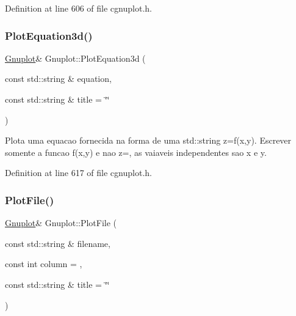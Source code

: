 Definition at line 606 of file cgnuplot.\+h.

\mbox{\label{class_gnuplot_a545ea6339c234d277339ab148cd11dba}} 
\subsubsection{\texorpdfstring{Plot\+Equation3d()}{PlotEquation3d()}}
{\footnotesize\ttfamily \hyperlink{class_gnuplot}{Gnuplot}\& Gnuplot\+::\+Plot\+Equation3d (\begin{DoxyParamCaption}\item[{const std\+::string \&}]{equation,  }\item[{const std\+::string \&}]{title = {\ttfamily \char`\"{}\char`\"{}} }\end{DoxyParamCaption})\hspace{0.3cm}{\ttfamily [inline]}}



Plota uma equacao fornecida na forma de uma std\+::string z=f(x,y). Escrever somente a funcao f(x,y) e nao z=, as vaiaveis independentes sao x e y. 



Definition at line 617 of file cgnuplot.\+h.

\mbox{\label{class_gnuplot_a12ba90a46e80421f655049cb1d1d835d}} 
\subsubsection{\texorpdfstring{Plot\+File()}{PlotFile()}\hspace{0.1cm}{\footnotesize\ttfamily [1/3]}}
{\footnotesize\ttfamily \hyperlink{class_gnuplot}{Gnuplot}\& Gnuplot\+::\+Plot\+File (\begin{DoxyParamCaption}\item[{const std\+::string \&}]{filename,  }\item[{const int}]{column = {},  }\item[{const std\+::string \&}]{title = {\ttfamily \char`\"{}\char`\"{}} }\end{DoxyParamCaption})\hspace{0.3cm}{\ttfamily [inline]}}



